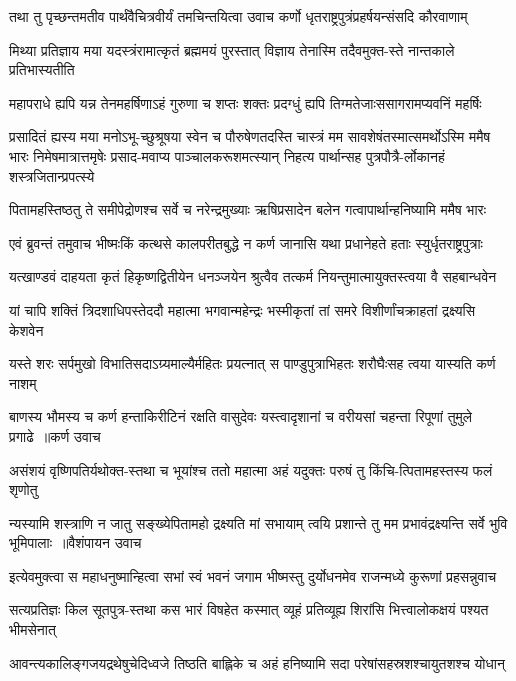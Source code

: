 \twolineshloka
{तथा तु पृच्छन्तमतीव पार्थंवैचित्रवीर्यं तमचिन्तयित्वा}
{उवाच कर्णो धृतराष्ट्रपुत्रंप्रहर्षयन्संसदि कौरवाणाम्}


\twolineshloka
{मिथ्या प्रतिज्ञाय मया यदस्त्रंरामात्कृतं ब्रह्ममयं पुरस्तात्}
{विज्ञाय तेनास्मि तदैवमुक्त-स्ते नान्तकाले प्रतिभास्यतीति}


\twolineshloka
{महापराधे ह्यपि यन्न तेनमहर्षिणाऽहं गुरुणा च शप्तः}
{शक्तः प्रदग्धुं ह्यपि तिग्मतेजाःससागरामप्यवनिं महर्षिः}


प्रसादितं ह्यस्य मया मनोऽभू-च्छुश्रूषया स्वेन च पौरुषेणतदस्ति चास्त्रं मम सावशेषंतस्मात्समर्थोऽस्मि ममैष भारः
\twolineshloka
{निमेषमात्रात्तमृषेः प्रसाद-मवाप्य पाञ्चालकरूशमत्स्यान्}
{निहत्य पार्थान्सह पुत्रपौत्रै-र्लोकानहं शस्त्रजितान्प्रपत्स्ये}


\twolineshloka
{पितामहस्तिष्ठतु ते समीपेद्रोणश्च सर्वे च नरेन्द्रमुख्याः}
{ऋषिप्रसादेन बलेन गत्वापार्थान्हनिष्यामि ममैष भारः}


\twolineshloka
{एवं ब्रुवन्तं तमुवाच भीष्मःकिं कत्थसे कालपरीतबुद्धे}
{न कर्ण जानासि यथा प्रधानेहते हताः स्युर्धृतराष्ट्रपुत्राः}


\twolineshloka
{यत्खाण्डवं दाहयता कृतं हिकृष्णद्वितीयेन धनञ्जयेन}
{श्रुत्वैव तत्कर्म नियन्तुमात्मायुक्तस्त्वया वै सहबान्धवेन}


\twolineshloka
{यां चापि शक्तिं त्रिदशाधिपस्तेददौ महात्मा भगवान्महेन्द्रः}
{भस्मीकृतां तां समरे विशीर्णांचक्राहतां द्रक्ष्यसि केशवेन}


\twolineshloka
{यस्ते शरः सर्पमुखो विभातिसदाऽग्र्यमाल्यैर्महितः प्रयत्नात्}
{स पाण्डुपुत्राभिहतः शरौघैःसह त्वया यास्यति कर्ण नाशम्}


\threelineshloka
{बाणस्य भौमस्य च कर्ण हन्ताकिरीटिनं रक्षति वासुदेवः}
{यस्त्वादृशानां च वरीयसां चहन्ता रिपूणां तुमुले प्रगाढे ॥कर्ण उवाच}
{}


\twolineshloka
{असंशयं वृष्णिपतिर्यथोक्त-स्तथा च भूयांश्च ततो महात्मा}
{अहं यदुक्तः परुषं तु किंचि-त्पितामहस्तस्य फलं शृणोतु}


\threelineshloka
{न्यस्यामि शस्त्राणि न जातु सङ्ख्येपितामहो द्रक्ष्यति मां सभायाम्}
{त्वयि प्रशान्ते तु मम प्रभावंद्रक्ष्यन्ति सर्वे भुवि भूमिपालाः ॥वैशंपायन उवाच}
{}


\twolineshloka
{इत्येवमुक्त्वा स महाधनुष्मान्हित्वा सभां स्वं भवनं जगाम}
{भीष्मस्तु दुर्योधनमेव राजन्मध्ये कुरूणां प्रहसन्नुवाच}


\twolineshloka
{सत्यप्रतिज्ञः किल सूतपुत्र-स्तथा कस भारं विषहेत कस्मात्}
{व्यूहं प्रतिव्यूह्य शिरांसि भित्त्वालोकक्षयं पश्यत भीमसेनात्}


\twolineshloka
{आवन्त्यकालिङ्गजयद्रथेषुचेदिध्वजे तिष्ठति बाह्लिके च}
{अहं हनिष्यामि सदा परेषांसहस्रशश्चायुतशश्च योधान्}


